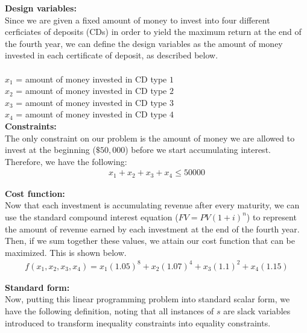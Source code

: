 \documentclass[11pt]{article}
\begin{document}
\begin{prob}{3}
\end{prob}

\begin{sol}

\textbf{Design variables:} \\ 
Since we are given a fixed amount of money to invest into four different cerficiates of deposits (CDs) in order to yield the maximum return at the end of the fourth year, we can define the design variables as the amount of money invested in each certificate of deposit, as described below.\\ \\ 
$x_{1}$ = amount of money invested in CD type $1$ \\
$x_{2}$ = amount of money invested in CD type $2$ \\
$x_{3}$ = amount of money invested in CD type $3$ \\
$x_{4}$ = amount of money invested in CD type $4$ \\

\textbf{Constraints:}  \\
The only constraint on our problem is the amount of money we are allowed to invest at the beginning ($\$50,000$) before we start accumulating interest. Therefore, we have the following:
\begin{eqnarray*}
x_{1} + x_{2} + x_{3} + x_{4} \leq 50000
\end{eqnarray*}

\textbf{Cost function:} \\
Now that each investment is accumulating revenue after every maturity, we can use the standard compound interest equation ($FV = PV(1+i)^{n}$) to represent the amount of revenue earned by each investment at the end of the fourth year. Then, if we sum together these values, we attain our cost function that can be maximized. This is shown below.
\begin{eqnarray*}
f(x_{1}, x_{2}, x_{3}, x_{4}) = x_{1}(1.05)^{8} + x_{2}(1.07)^{4} + x_{3}(1.1)^{2} + x_{4}(1.15)
\end{eqnarray*}

\textbf{Standard form:} \\
Now, putting this linear programming problem into standard scalar form, we have the following definition, noting that all instances of $s$ are slack variables introduced to transform inequality constraints into equality constraints.  \\


\end{sol}
\end{document}
